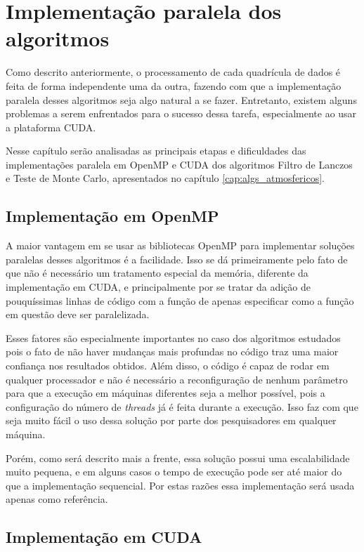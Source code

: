 \chapter{Implementação paralela dos algoritmos}

Como descrito anteriormente, o processamento de cada quadrícula de dados é feita de forma independente uma da outra, fazendo com que a implementação paralela desses algoritmos seja algo natural a se fazer. Entretanto, existem alguns problemas a serem enfrentados para o sucesso dessa tarefa, especialmente ao usar a plataforma CUDA.

Nesse capítulo serão analisadas as principais etapas e dificuldades das implementações paralela em OpenMP \cite{openmp_guide} e CUDA \cite{cuda_guide} dos algoritmos Filtro de Lanczos e Teste de Monte Carlo, apresentados no capítulo \ref{cap:algs_atmosfericos}.

\section{Implementação em OpenMP}

A maior vantagem em se usar as bibliotecas OpenMP \cite{openmp_guide} para implementar soluções paralelas desses algoritmos é a facilidade. Isso se dá primeiramente pelo fato de que não é necessário um tratamento especial da memória, diferente da implementação em CUDA, e principalmente por se tratar da adição de pouquíssimas linhas de código com a função de apenas especificar como a função em questão deve ser paralelizada.

Esses fatores são especialmente importantes no caso dos algoritmos estudados pois o fato de não haver mudanças mais profundas no código traz uma maior confiança nos resultados obtidos. Além disso, o código é capaz de rodar em qualquer processador e não é necessário a reconfiguração de nenhum parâmetro para que a execução em máquinas diferentes seja a melhor possível, pois a configuração do número de \textit{threads} já é feita durante a execução. Isso faz com que seja muito fácil o uso dessa solução por parte dos pesquisadores em qualquer máquina.

Porém, como será descrito mais a frente, essa solução possui uma escalabilidade muito pequena, e em alguns casos o tempo de execução pode ser até maior do que a implementação sequencial. Por estas razões essa implementação será usada apenas como referência.

\section{Implementação em CUDA}

